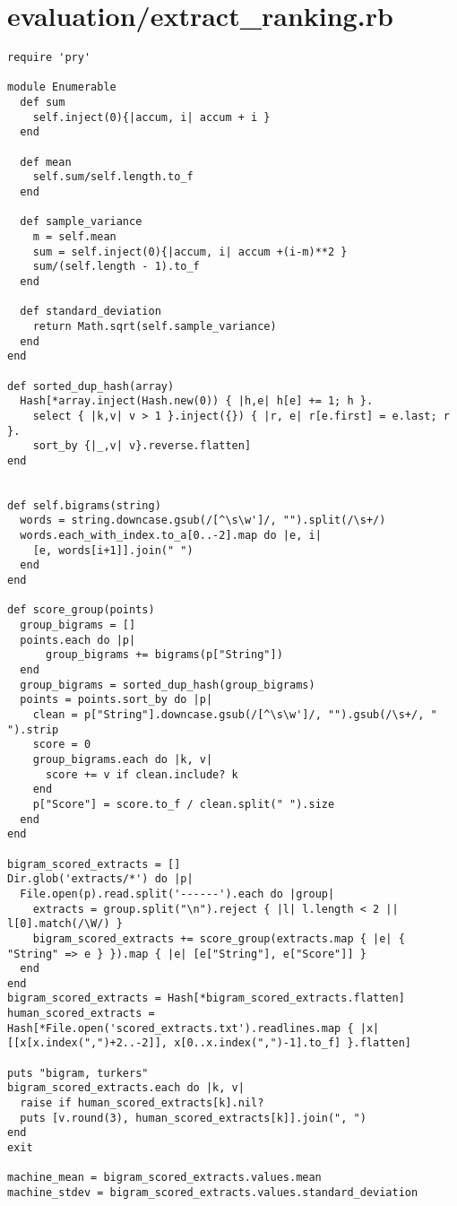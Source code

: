 \documentclass{article}
\begin{document}
\section*{evaluation/extract\_ranking.rb}
\begin{verbatim}
require 'pry'

module Enumerable
  def sum
	self.inject(0){|accum, i| accum + i }
  end

  def mean
	self.sum/self.length.to_f
  end

  def sample_variance
	m = self.mean
	sum = self.inject(0){|accum, i| accum +(i-m)**2 }
	sum/(self.length - 1).to_f
  end

  def standard_deviation
	return Math.sqrt(self.sample_variance)
  end
end

def sorted_dup_hash(array)
  Hash[*array.inject(Hash.new(0)) { |h,e| h[e] += 1; h }.
    select { |k,v| v > 1 }.inject({}) { |r, e| r[e.first] = e.last; r }.
    sort_by {|_,v| v}.reverse.flatten]
end


def self.bigrams(string)
  words = string.downcase.gsub(/[^\s\w']/, "").split(/\s+/)
  words.each_with_index.to_a[0..-2].map do |e, i|
    [e, words[i+1]].join(" ")
  end
end

def score_group(points)
  group_bigrams = []
  points.each do |p|
      group_bigrams += bigrams(p["String"])
  end
  group_bigrams = sorted_dup_hash(group_bigrams)
  points = points.sort_by do |p|
    clean = p["String"].downcase.gsub(/[^\s\w']/, "").gsub(/\s+/, " ").strip
    score = 0
    group_bigrams.each do |k, v|
      score += v if clean.include? k
    end
    p["Score"] = score.to_f / clean.split(" ").size
  end
end

bigram_scored_extracts = []
Dir.glob('extracts/*') do |p|
  File.open(p).read.split('------').each do |group|
    extracts = group.split("\n").reject { |l| l.length < 2 || l[0].match(/\W/) }
    bigram_scored_extracts += score_group(extracts.map { |e| { "String" => e } }).map { |e| [e["String"], e["Score"]] }
  end
end
bigram_scored_extracts = Hash[*bigram_scored_extracts.flatten]
human_scored_extracts = Hash[*File.open('scored_extracts.txt').readlines.map { |x| [[x[x.index(",")+2..-2]], x[0..x.index(",")-1].to_f] }.flatten]

puts "bigram, turkers"
bigram_scored_extracts.each do |k, v|
  raise if human_scored_extracts[k].nil?
  puts [v.round(3), human_scored_extracts[k]].join(", ")
end
exit

machine_mean = bigram_scored_extracts.values.mean
machine_stdev = bigram_scored_extracts.values.standard_deviation


\end{verbatim}
\end{document}

